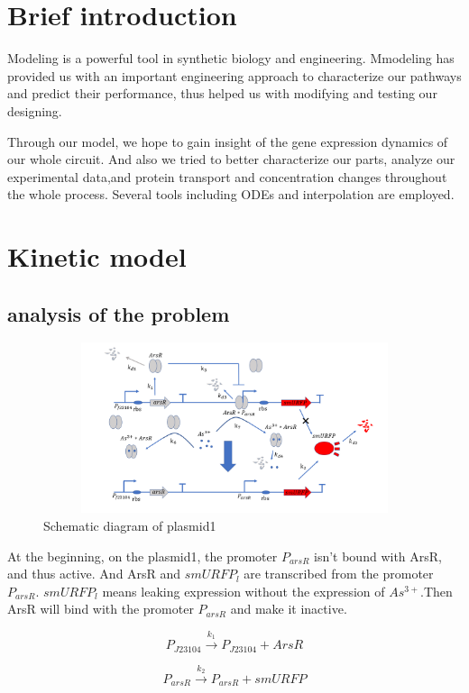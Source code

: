 \section{Brief introduction}
Modeling is a powerful tool in synthetic biology and engineering. Mmodeling has provided us with an important engineering approach to characterize our pathways and predict their performance, thus helped us with modifying and testing our designing.

Through our model, we hope to gain insight of the gene expression dynamics of our whole circuit. And also we tried to better characterize our parts, analyze our experimental data,and protein transport and concentration changes throughout the whole process. Several tools including ODEs and interpolation are employed.


\section{Kinetic model}
\subsection{analysis of the problem}

\begin{figure}[h]
\centering
\includegraphics[width=12cm,height=5cm]{1}
\caption{Schematic diagram of plasmid1}
\end{figure}

At the beginning, on the plasmid1, the promoter $P_{arsR}$ isn't bound with ArsR, and thus active. And ArsR and $smURFP_l$ are transcribed from the promoter $P_{arsR}$. $smURFP_l$ means leaking expression without the expression of $As^{3+}$.Then ArsR will bind with the promoter $P_{arsR}$ and make it inactive. 

\begin{equation}
P_{J23104} \stackrel{k_1}{\longrightarrow} P_{J23104}+ArsR
\end{equation}

\begin{equation}
P_{arsR} \stackrel{k_2}{\longrightarrow} P_{arsR} +smURFP
\end{equation}

